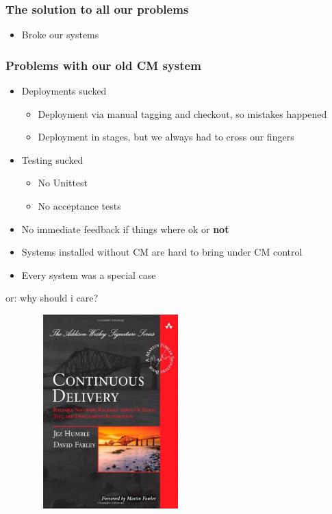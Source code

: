 \documentclass{beamer}
\begin{document}
\begin{frame}
  \frametitle{The solution to all our problems}
  \pause
  \begin{itemize}
  \item Broke our systems
  \end{itemize}
\end{frame}

\begin{frame}
\end{frame}

\begin{frame}
  \frametitle{Problems with our old CM system}

  \begin{itemize}
  \item <1-> Deployments sucked
    \begin{itemize}
    \item <2-> Deployment via manual tagging and checkout, so mistakes happened
    \item <2-> Deployment in stages, but we always had to cross our fingers
    \end{itemize}
  \item <3-> Testing sucked
    \pause
    \begin{itemize}
    \item <4-> No Unittest
    \item <4-> No acceptance tests
    \end{itemize}
  \item <5-> No immediate feedback if things where ok or \textbf{not}
  \item <6-> Systems installed without CM are hard to bring under CM control
  \item <7-> Every system was a special case
  \end{itemize}
\end{frame}

\begin{frame}

  or: why should i care?
\end{frame}

\begin{frame}
  \begin{figure}[ht]
    \centering
      \includegraphics[height=7.5cm,width=6cm]{../pics/cd_book}
    \label{fig:stack}
  \end{figure}
\end{frame}
\end{document}
